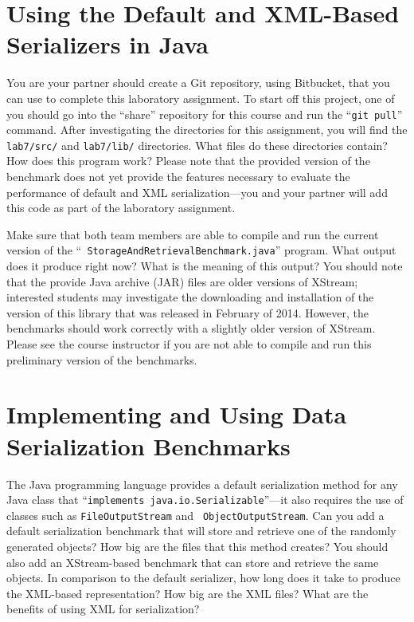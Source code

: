 \vspace*{-.05in}
\section*{Using the Default and XML-Based Serializers in Java}

You are your partner should create a Git repository, using Bitbucket, that you can use to complete this laboratory
assignment.  To start off this project, one of you should go into the ``share'' repository for this course and run the
``{\tt git pull}'' command. After investigating the directories for this assignment, you will find the {\tt lab7/src/}
and {\tt lab7/lib/} directories. What files do these directories contain? How does this program work? Please note that
the provided version of the benchmark does not yet provide the features necessary to evaluate the performance of default 
and XML serialization---you and your partner will add this code as part of the laboratory assignment.

Make sure that both team members are able to compile and run the current version of the ``{\tt
  StorageAndRetrievalBenchmark.java}'' program. What output does it produce right now? What is the meaning of this
output? You should note that the provide Java archive (JAR) files are older versions of XStream; interested students may
investigate the downloading and installation of the version of this library that was released in February of 2014.
However, the benchmarks should work correctly with a slightly older version of XStream. Please see the course instructor
if you are not able to compile and run this preliminary version of the benchmarks.

\vspace*{-.05in}
\section*{Implementing and Using Data Serialization Benchmarks}

The Java programming language provides a default serialization method for any Java class that ``{\tt implements
  java.io.Serializable}''---it also requires the use of classes such as {\tt FileOutputStream} and {\tt
  ObjectOutputStream}. Can you add a default serialization benchmark that will store and retrieve one of the randomly
generated objects? How big are the files that this method creates?  You should also add an XStream-based benchmark that
can store and retrieve the same objects. In comparison to the default serializer, how long does it take to produce the
XML-based representation? How big are the XML files? What are the benefits of using XML for serialization?

